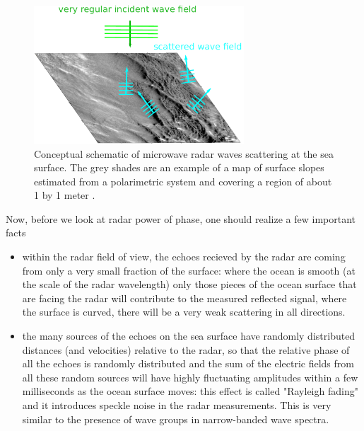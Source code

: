 \begin{figure}[htb]
\centerline{\includegraphics[width=0.7\textwidth]{FIGS_CH_SAT/scatter.pdf}}
  \caption{Conceptual schematic of microwave radar waves scattering at the sea surface. The grey shades are an example of a map of surface slopes estimated from a polarimetric system and covering a region of about 1 by 1 meter \citep{Laxague&al.2018}.}\label{fig:scatter}
\end{figure}
Now, before we look at radar power of phase, one should realize a few important facts 
\begin{itemize}
\item within the radar field of view, the echoes recieved by the radar are coming from only a very small fraction of the surface: where the ocean is smooth (at the scale of the radar wavelength) only those pieces of the ocean surface that are facing the radar will contribute to the measured reflected signal, where the surface is curved, there will be a very weak scattering in all directions. 
\item the many sources of the echoes on the sea surface have randomly distributed distances (and velocities) relative to the radar, so that  the relative phase of all the echoes is randomly distributed and the sum of the electric fields from all these random sources will have highly fluctuating amplitudes within a few milliseconds as the ocean surface moves: this effect is called "Rayleigh fading" and it introduces speckle noise in the radar measurements. This is very similar to the presence of wave groups in narrow-banded wave spectra. 
\end{itemize}


